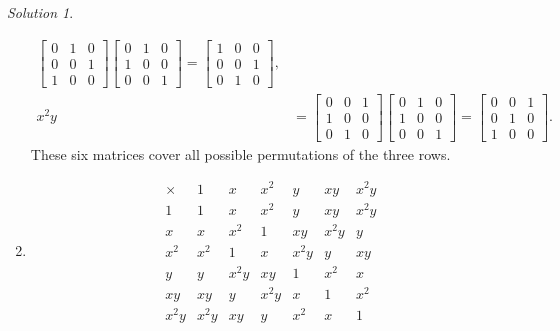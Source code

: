 \documentclass[11pt]{report}
\theoremstyle{remark}
\newtheorem*{solution}{Solution}
\begin{document}
\begin{solution}
\begin{enumerate}
\begin{align*}
\begin{bmatrix}
                    0 & 1 & 0 \\ 0 & 0 & 1 \\ 1 & 0 & 0
                \end{bmatrix} \begin{bmatrix}
                    0 & 1 & 0 \\ 1 & 0 & 0 \\ 0 & 0 & 1
                \end{bmatrix} = \begin{bmatrix}
                    1 & 0 & 0 \\
                    0 & 0 & 1 \\
                    0 & 1 & 0
                \end{bmatrix}, \\
                x^2y &= \begin{bmatrix}
                    0 & 0 & 1 \\ 
                    1 & 0 & 0 \\
                    0 & 1 & 0
                \end{bmatrix} \begin{bmatrix}
                    0 & 1 & 0 \\ 1 & 0 & 0 \\ 0 & 0 & 1
                \end{bmatrix} = \begin{bmatrix}
                    0 & 0 & 1 \\
                    0 & 1 & 0 \\
                    1 & 0 & 0
                \end{bmatrix}.
            \end{align*}
            These six matrices cover all possible permutations of the three rows.

            \item \mbox{}
            \[
                \begin{array}{c|cccccc}
                    \times  & 1     & x     & x^2   & y     & xy    & x^2y  \\\hline 
                    1       & 1     & x     & x^2   & y     & xy    & x^2y  \\
                    x       & x     & x^2   & 1     & xy    & x^2y  & y     \\
                    x^2     & x^2   & 1     & x     & x^2y  & y     & xy    \\
                    y       & y     & x^2y  & xy    & 1     & x^2   & x     \\
                    xy      & xy    & y     & x^2y  & x     & 1     & x^2   \\
                    x^2y    & x^2y  & xy    & y     & x^2   & x     & 1     
                \end{array}
            \]
        \end{enumerate}
    \end{solution}
\end{document}
